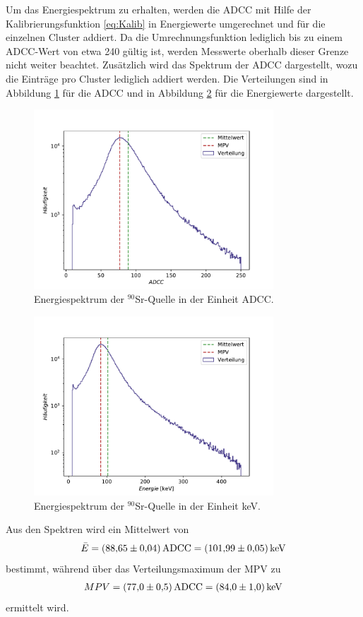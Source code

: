 \FloatBarrier
Um das Energiespektrum zu erhalten, werden die ADCC mit Hilfe der Kalibrierungsfunktion \eqref{eq:Kalib} in Energiewerte umgerechnet und für die einzelnen Cluster addiert. Da die Umrechnungsfunktion lediglich bis zu einem ADCC-Wert von etwa 240 gültig ist, werden Messwerte oberhalb dieser Grenze nicht weiter beachtet.
Zusätzlich wird das Spektrum der ADCC dargestellt, wozu die Einträge pro Cluster lediglich addiert werden.
Die Verteilungen sind in Abbildung \ref{fig:spektrumADCC} für die ADCC und in Abbildung \ref{fig:spektrumkeV} für die Energiewerte dargestellt.

\begin{figure}
  \centering
  \includegraphics[width=0.8\textwidth]{plots/spectrum_adc.pdf}
  \caption{Energiespektrum der $^{90}$Sr-Quelle in der Einheit ADCC.}
  \label{fig:spektrumADCC}
\end{figure}

\begin{figure}
  \centering
  \includegraphics[width=0.8\textwidth]{plots/spectrum_keV.pdf}
  \caption{Energiespektrum der $^{90}$Sr-Quelle in der Einheit keV.}
  \label{fig:spektrumkeV}
\end{figure}
\FloatBarrier

Aus den Spektren wird ein Mittelwert von
\begin{align*}
  \bar{E} = \SI{88.65 \pm 0.04}{ADCC} = \SI{101.99 \pm 0.05}{\kilo\electronvolt}
\end{align*}
bestimmt, während über das Verteilungsmaximum der MPV zu
\begin{align*}
  MPV =  \SI{77 \pm 0.5}{ADCC} = \SI{84.0 \pm 1.0}{\kilo\electronvolt}
\end{align*}
ermittelt wird.
